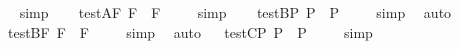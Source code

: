 \begin{isabellebody}
\isadelimproof
\ %
\endisadelimproof
%
\isatagproof
{}\isamarkupfalse%
\ simp\ \isamarkupfalse%
%
\endisatagproof
{\isafoldproof}%
%
\isadelimproof
%
\endisadelimproof
\isanewline
\ \isamarkupfalse%
\ test{\isacharunderscore}A{\isacharunderscore}F{\isacharcolon}\ {\isachardoublequoteopen}{\isacharbrackleft}\isactrlbold {\isasymbox}\isactrlbold {\isasymdiamond}{\isasymphi}\isactrlsup F\ \isactrlbold {\isasymrightarrow}\ \isactrlbold {\isasymdiamond}{\isasymphi}\isactrlsup F{\isacharbrackright}\ {\isacharequal}\ {\isasymtop}{\isachardoublequoteclose}%
\isadelimproof
\ %
\endisadelimproof
%
\isatagproof
{}\isamarkupfalse%
\ simp\ \isamarkupfalse%
%
\endisatagproof
{\isafoldproof}%
%
\isadelimproof
%
\endisadelimproof
\isanewline
\isanewline
\ \isamarkupfalse%
\ test{\isacharunderscore}B{\isacharunderscore}P{\isacharcolon}\ {\isachardoublequoteopen}{\isacharbrackleft}\isactrlbold {\isasymdiamond}\isactrlbold {\isasymbox}{\isasymphi}\isactrlsup P\ \isactrlbold {\isasymrightarrow}\ \isactrlbold {\isasymdiamond}{\isasymphi}\isactrlsup P{\isacharbrackright}\ {\isacharequal}\ {\isasymtop}{\isachardoublequoteclose}%
\isadelimproof
\ %
\endisadelimproof
%
\isatagproof
{}\isamarkupfalse%
\ simp\ \isamarkupfalse%
\ auto%
\endisatagproof
{\isafoldproof}%
%
\isadelimproof
%
\endisadelimproof
\isanewline
\ \isamarkupfalse%
\ test{\isacharunderscore}B{\isacharunderscore}F{\isacharcolon}\ {\isachardoublequoteopen}{\isacharbrackleft}\isactrlbold {\isasymdiamond}\isactrlbold {\isasymbox}{\isasymphi}\isactrlsup F\ \isactrlbold {\isasymrightarrow}\ \isactrlbold {\isasymdiamond}{\isasymphi}\isactrlsup F{\isacharbrackright}\ {\isacharequal}\ {\isasymtop}{\isachardoublequoteclose}%
\isadelimproof
\ %
\endisadelimproof
%
\isatagproof
{}\isamarkupfalse%
\ simp\ \isamarkupfalse%
\ auto%
\endisatagproof
{\isafoldproof}%
%
\isadelimproof
%
\endisadelimproof
\isanewline
\isanewline
\ \isamarkupfalse%
\ test{\isacharunderscore}C{\isacharunderscore}P{\isacharcolon}\ {\isachardoublequoteopen}{\isacharbrackleft}\isactrlbold {\isasymbox}\isactrlbold {\isasymdiamond}{\isasymphi}\isactrlsup P\ \isactrlbold {\isasymrightarrow}\ \isactrlbold {\isasymbox}{\isasymphi}\isactrlsup P{\isacharbrackright}\ {\isacharequal}\ {\isasymtop}{\isachardoublequoteclose}%
\isadelimproof
\ %
\endisadelimproof
%
\isatagproof
{}\isamarkupfalse%
\ simp%
\endisatagproof
{\isafoldproof}%
%
\isadelimproof

\end{isabellebody}
